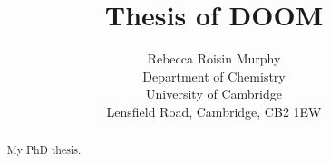 \documentclass[12pt]{report}
\begin{document}
\title{Thesis of DOOM}

\author{Rebecca Roisin Murphy \\ 
Department of Chemistry \\
University of Cambridge \\
Lensfield Road, Cambridge, CB2 1EW}

\maketitle

\begin{abstract}
  My PhD thesis.
\end{abstract}

\tableofcontents













\end{document}
